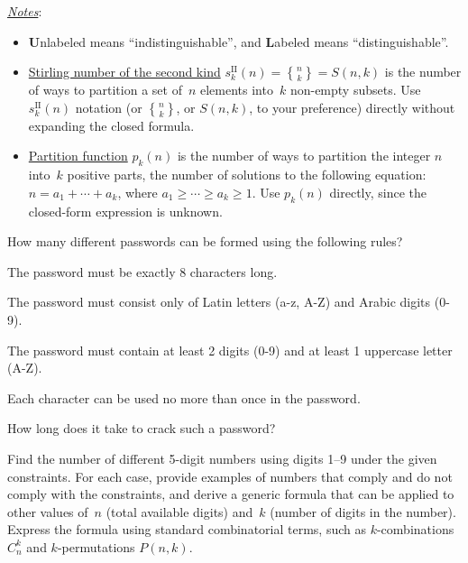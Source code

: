 \documentclass[a4paper,12pt]{article}
\DeclareRobustCommand{\stirling}{\genfrac\{\}{0pt}{}}
\begin{document}
\begin{tasks}[align=right,left=0pt]
    \smallskip
    \textit{\uline{Notes}}:

    \begin{itemize}[label=$\ast$, noitemsep]
        \item \textbf{U}nlabeled means \enquote{indistinguishable}, and \textbf{L}abeled means \enquote{distinguishable}.

        \item \href{https://en.wikipedia.org/wiki/Stirling_numbers_of_the_second_kind}{Stirling number of the second kind} $s^{\text{II}}_k(n) = \stirling{n}{k} = S(n, k)$ is the number of ways to partition a set of~$n$ elements into~$k$ non-empty subsets.
        Use $s^{\text{II}}_k(n)$ notation (or $\stirling{n}{k}$, or $S(n, k)$, to your preference) directly without expanding the closed formula.

        \item \href{https://en.wikipedia.org/wiki/Partition_(number_theory)#Restricted_part_size_or_number_of_parts}{Partition function} $p_k(n)$ is the number of ways to partition the integer $n$ into~$k$ positive parts, \ie the number of solutions to the following equation: $n = a_1 + \dotsb + a_k$, where $a_1 \geq \dotsb \geq a_k \geq 1$.
        Use $p_k(n)$ directly, since the closed-form expression is unknown.
    \end{itemize}

    \endgroup


    \item How many different passwords can be formed using the following rules?

    \begin{items}
        \item The password must be exactly 8 characters long.
        \item The password must consist only of Latin letters (a-z, A-Z) and Arabic digits (0-9).
        \item The password must contain at least 2 digits (0-9) and at least 1 uppercase letter (A-Z).
        \item Each character can be used no more than once in the password.
    \end{items}

    \smallskip
    How long does it take to crack such a password?


    \filbreak

    \item Find the number of different 5-digit numbers using digits 1--9 under the given constraints.
    For each case, provide examples of numbers that comply and do not comply with the constraints, and derive a generic formula that can be applied to other values of~$n$ (total available digits) and~$k$ (number of digits in the number).
    Express the formula using standard combinatorial terms, such as $k$-combinations $C_n^k$ and $k$-permutations $P(n, k)$.


\end{tasks}
\end{document}
